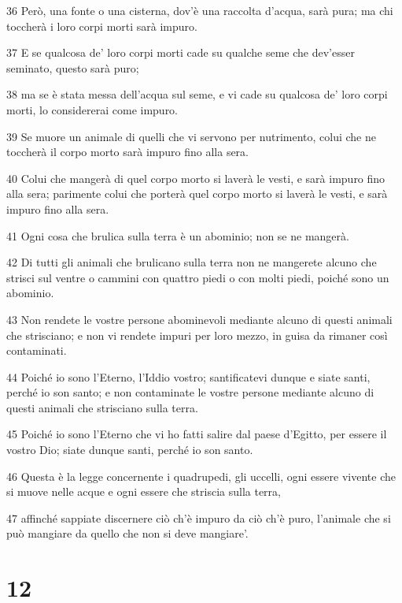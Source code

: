 \par 36 Però, una fonte o una cisterna, dov'è una raccolta d'acqua, sarà pura; ma chi toccherà i loro corpi morti sarà impuro.
\par 37 E se qualcosa de' loro corpi morti cade su qualche seme che dev'esser seminato, questo sarà puro;
\par 38 ma se è stata messa dell'acqua sul seme, e vi cade su qualcosa de' loro corpi morti, lo considererai come impuro.
\par 39 Se muore un animale di quelli che vi servono per nutrimento, colui che ne toccherà il corpo morto sarà impuro fino alla sera.
\par 40 Colui che mangerà di quel corpo morto si laverà le vesti, e sarà impuro fino alla sera; parimente colui che porterà quel corpo morto si laverà le vesti, e sarà impuro fino alla sera.
\par 41 Ogni cosa che brulica sulla terra è un abominio; non se ne mangerà.
\par 42 Di tutti gli animali che brulicano sulla terra non ne mangerete alcuno che strisci sul ventre o cammini con quattro piedi o con molti piedi, poiché sono un abominio.
\par 43 Non rendete le vostre persone abominevoli mediante alcuno di questi animali che strisciano; e non vi rendete impuri per loro mezzo, in guisa da rimaner così contaminati.
\par 44 Poiché io sono l'Eterno, l'Iddio vostro; santificatevi dunque e siate santi, perché io son santo; e non contaminate le vostre persone mediante alcuno di questi animali che strisciano sulla terra.
\par 45 Poiché io sono l'Eterno che vi ho fatti salire dal paese d'Egitto, per essere il vostro Dio; siate dunque santi, perché io son santo.
\par 46 Questa è la legge concernente i quadrupedi, gli uccelli, ogni essere vivente che si muove nelle acque e ogni essere che striscia sulla terra,
\par 47 affinché sappiate discernere ciò ch'è impuro da ciò ch'è puro, l'animale che si può mangiare da quello che non si deve mangiare'.

\chapter{12}

